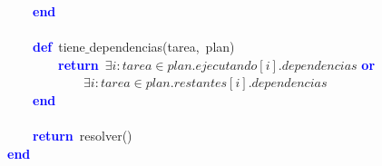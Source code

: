 \mbox{}\ \ \ \ \textbf{\textcolor{Blue}{end}} \\
\mbox{} \\
\mbox{}\ \ \ \ \textbf{\textcolor{Blue}{def}}\ tiene$\_$dependencias\textcolor{BrickRed}{(}tarea\textcolor{BrickRed}{,}\ plan\textcolor{BrickRed}{)} \\
\mbox{}\ \ \ \ \ \ \ \ \textbf{\textcolor{Blue}{return}}\ $\exists i : tarea \in plan.ejecutando[i].dependencias$ \textbf{\textcolor{Blue}{or}} \\
\mbox{}\ \ \ \ \ \ \ \ \ \ \ \ $\exists i : tarea \in plan.restantes[i].dependencias$ \\
\mbox{}\ \ \ \ \textbf{\textcolor{Blue}{end}} \\
\mbox{} \\
\mbox{}\ \ \ \ \textbf{\textcolor{Blue}{return}}\ resolver\textcolor{BrickRed}{()} \\
\mbox{}\textbf{\textcolor{Blue}{end}} \\
\mbox{}
